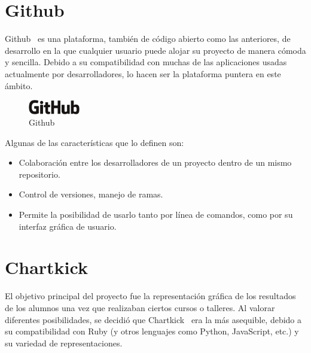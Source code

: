 
\section{Github}
\label{3:sec:4}

Github~\cite{Github} es una plataforma, también de código abierto como las anteriores, de desarrollo en la que cualquier usuario puede alojar su proyecto de manera cómoda y sencilla. Debido a su compatibilidad con muchas de las aplicaciones usadas actualmente por desarrolladores, lo hacen ser la plataforma puntera en este ámbito.

\begin{figure}[!th]
\begin{center}
\includegraphics[width=0.2\textwidth]{images/logo_github.eps}
\caption{Github}
\label{fig:7}
\end{center}
\end{figure}

Algunas de las características que lo definen son:

\begin{itemize}
    \item Colaboración entre los desarrolladores de un proyecto dentro de un mismo repositorio.
    \item Control de versiones, manejo de ramas.
    \item Permite la posibilidad de usarlo tanto por línea de comandos, como por su interfaz gráfica de usuario.
\end{itemize}


\section{Chartkick}
\label{3:sec:5}

El objetivo principal del proyecto fue la representación gráfica de los resultados de los alumnos una vez que realizaban ciertos cursos o talleres. Al valorar diferentes posibilidades, se decidió que Chartkick~\cite{Chartkick} era la más asequible, 
debido a su compatibilidad con Ruby (y otros lenguajes como Python, JavaScript, etc.) y su variedad de representaciones. 

